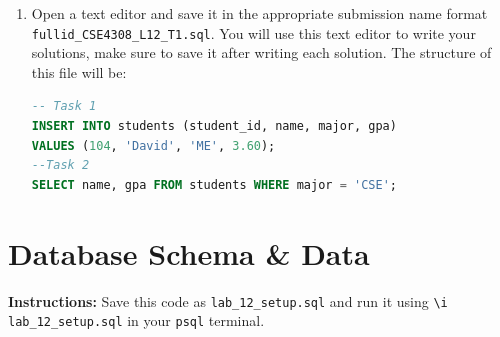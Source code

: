 \documentclass[12pt,a4paper]{article}
\begin{document}
\begin{enumerate}
After loading the SQL file, reconnect to PostgreSQL to verify that the tables have been created.

1. Reconnect to Your Database:

   \begin{lstlisting}[language=SQL]
   psql -h localhost -U student_12345 -d cse4308_12345
   \end{lstlisting}

2. Check Tables:

   Verify the tables have been created by listing them:

   \begin{lstlisting}[language=SQL]
   \dt
   \end{lstlisting}

3. View Table Data:

   Verify the data by running the following SQL queries:

   \begin{lstlisting}[language=SQL]
   SELECT * FROM <table_name>;
   \end{lstlisting}

\item Open a text editor and save it in the appropriate submission name format \\ \texttt{fullid\_CSE4308\_L12\_T1.sql}. You will use this text editor to write your solutions, make sure to save it after writing each solution. The structure of this file will be:
\begin{lstlisting}[language=SQL]
-- Task 1
INSERT INTO students (student_id, name, major, gpa)
VALUES (104, 'David', 'ME', 3.60);
--Task 2
SELECT name, gpa FROM students WHERE major = 'CSE';
\end{lstlisting}
\end{enumerate}

\newpage
\section{Database Schema \& Data}
\textbf{Instructions:} Save this code as \texttt{lab\_12\_setup.sql} and run it using \texttt{\textbackslash i lab\_12\_setup.sql} in your \texttt{psql} terminal. 
\end{document}
